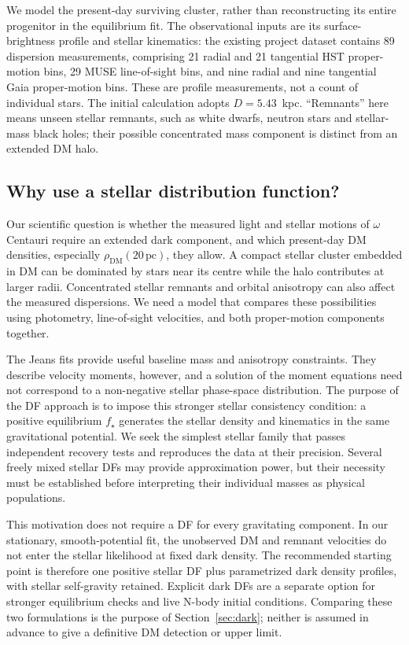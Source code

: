 \documentclass[11pt,a4paper]{article}
\newcommand{\pc}{\,\mathrm{pc}}
\newcommand{\dm}{\mathrm{DM}}
\begin{document}
We model the present-day surviving cluster, rather than reconstructing its
entire progenitor in the equilibrium fit. The observational inputs are its
surface-brightness profile and stellar kinematics: the existing project
dataset contains 89 dispersion measurements, comprising 21 radial and 21
tangential HST proper-motion bins, 29 MUSE line-of-sight bins, and nine radial
and nine tangential Gaia proper-motion bins. These are profile measurements,
not a count of individual stars. The initial calculation adopts $D=5.43$~kpc.
``Remnants'' here means unseen stellar remnants, such as white dwarfs,
neutron stars and stellar-mass black holes; their possible concentrated mass
component is distinct from an extended DM halo.

\subsection{Why use a stellar distribution function?}

Our scientific question is whether the measured light and stellar motions
of $\omega$ Centauri require an extended dark component, and which present-day
DM densities, especially $\rho_\dm(20\pc)$, they allow. A compact stellar
cluster embedded in DM can be dominated by stars near its centre while the
halo contributes at larger radii. Concentrated stellar remnants and orbital
anisotropy can also affect the measured dispersions. We need a model that
compares these possibilities using photometry, line-of-sight velocities,
and both proper-motion components together.

The Jeans fits provide useful baseline mass and anisotropy constraints.
They describe velocity moments, however, and a solution of the moment
equations need not correspond to a non-negative stellar phase-space
distribution. The purpose of the DF approach is to impose this stronger
stellar consistency condition: a positive equilibrium $f_\star$ generates
the stellar density and kinematics in the same gravitational potential.
We seek the simplest stellar family that passes independent recovery tests
and reproduces the data at their precision. Several freely mixed stellar
DFs may provide approximation power, but their necessity must be established
before interpreting their individual masses as physical populations.

This motivation does not require a DF for every gravitating component.
In our stationary, smooth-potential fit, the unobserved DM and remnant
velocities do not enter the stellar likelihood at fixed dark density.
The recommended starting point is therefore one positive stellar DF plus
parametrized dark density profiles, with stellar self-gravity retained.
Explicit dark DFs are a separate option for stronger equilibrium checks
and live N-body initial conditions. Comparing these two formulations is
the purpose of Section~\ref{sec:dark}; neither is assumed in advance to
give a definitive DM detection or upper limit.
\end{document}

